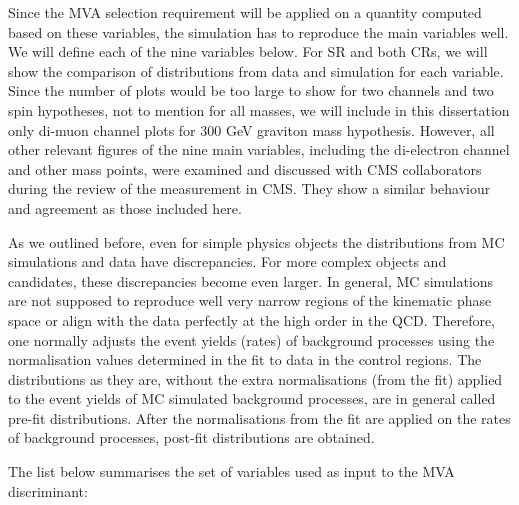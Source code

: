 Since the MVA selection requirement will be applied on a quantity computed based on these variables, the simulation has to  reproduce the main variables well. We will define each of the nine variables below. For SR and both CRs, we will show the comparison of distributions from data and simulation for each variable. Since the number of plots would be too large to show for two channels and two spin hypotheses, not to mention for all masses, we will include in this dissertation only di-muon channel plots for 300 GeV graviton mass hypothesis. However, all other relevant figures of the nine main variables, including the di-electron channel and other mass points,  were examined and discussed with CMS collaborators during the review of the measurement in CMS. They show a similar behaviour and agreement as those included here.
           
As we outlined before, even for simple physics objects the distributions from MC simulations and data have discrepancies. For more complex objects and candidates, these discrepancies become even larger. In general, MC simulations are not supposed to reproduce well very narrow regions of the kinematic phase space or align with the data perfectly at the high order in the QCD. Therefore, one normally adjusts the event yields (rates) of background processes using the normalisation values determined in the fit to data in the control regions. The distributions as they are, without the extra normalisations (from the fit) applied to the event yields of MC simulated background processes, are in general called pre-fit distributions. After the normalisations from the fit are applied on the rates of background processes, post-fit distributions are obtained. 

The list below summarises the set of variables used as input to the MVA discriminant:

